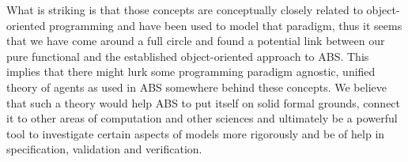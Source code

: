 What is striking is that those concepts are conceptually closely related to object-oriented programming and have been used to model that paradigm, thus it seems that we have come around a full circle and found a potential link between our pure functional and the established object-oriented approach to ABS. This implies that there might lurk some programming paradigm agnostic, unified theory of agents as used in ABS somewhere behind these concepts. We believe that such a theory would help ABS to put itself on solid formal grounds, connect it to other areas of computation and other sciences and ultimately be a powerful tool to investigate certain aspects of models more rigorously and be of help in specification, validation and verification.